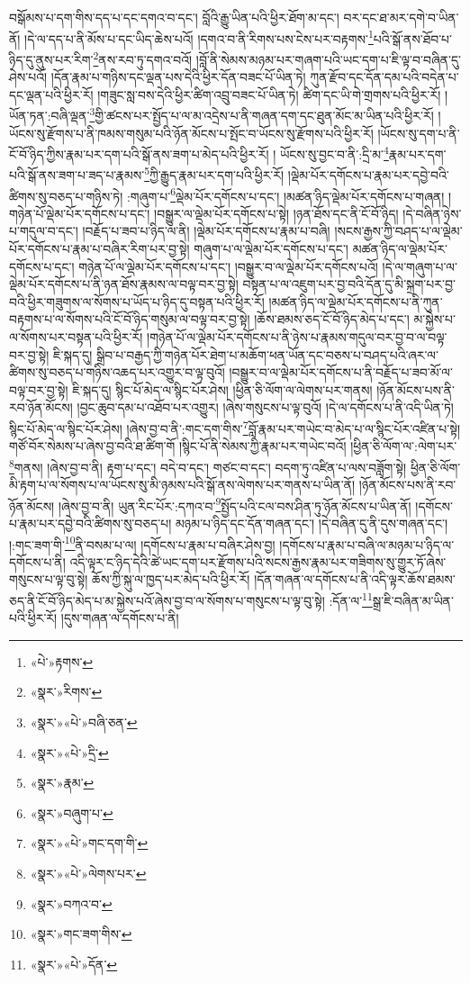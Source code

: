 བསྒོམས་པ་དག་གིས་དད་པ་དང་དགའ་བ་དང་། བློའི་རྒྱུ་ཡིན་པའི་ཕྱིར་ཐོག་མ་དང་། བར་དང་ཐ་མར་དགེ་བ་ཡིན་ནོ། །དེ་ལ་དད་པ་ནི་མོས་པ་དང་ཡིད་ཆེས་པའོ། །དགའ་བ་ནི་རིགས་པས་ངེས་པར་བརྟགས་\footnote{«པེ་»རྟགས་}པའི་སྒོ་ནས་ཐོབ་པ་ཉིད་དུ་ནུས་པར་རིག་\footnote{«སྣར་»རིགས་}ནས་རབ་ཏུ་དགའ་བའོ། །བློ་ནི་སེམས་མཉམ་པར་གཞག་པའི་ཡང་དག་པ་ཇི་ལྟ་བ་བཞིན་དུ་ཤེས་པའོ། །དོན་རྣམ་པ་གཉིས་དང་ལྡན་པས་དེའི་ཕྱིར་དོན་བཟང་པོ་ཡིན་ཏེ། ཀུན་རྫོབ་དང་དོན་དམ་པའི་བདེན་པ་དང་ལྡན་པའི་ཕྱིར་རོ། །གཟུང་སླ་བས་དེའི་ཕྱིར་ཚིག་འབྲུ་བཟང་པོ་ཡིན་ཏེ། ཚིག་དང་ཡི་གེ་གྲགས་པའི་ཕྱིར་རོ། །ཡོན་ཏན་:བཞི་ལྡན་\footnote{«སྣར་»«པེ་»བཞི་ཅན་}གྱི་ཚངས་པར་སྤྱོད་པ་ལ་མ་འདྲེས་པ་ནི་གཞན་དག་དང་ཐུན་མོང་མ་ཡིན་པའི་ཕྱིར་རོ། །ཡོངས་སུ་རྫོགས་པ་ནི་ཁམས་གསུམ་པའི་ཉོན་མོངས་པ་སྤོང་བ་ཡོངས་སུ་རྫོགས་པའི་ཕྱིར་རོ། །ཡོངས་སུ་དག་པ་ནི་ངོ་བོ་ཉིད་ཀྱིས་རྣམ་པར་དག་པའི་སྒོ་ནས་ཟག་པ་མེད་པའི་ཕྱིར་རོ། །
ཡོངས་སུ་བྱང་བ་ནི་:དྲི་མ་\footnote{«སྣར་»«པེ་»དྲི་}རྣམ་པར་དག་པའི་སྒོ་ནས་ཟག་པ་ཟད་པ་རྣམས་\footnote{«སྣར་»རྣམ་}ཀྱི་རྒྱུད་རྣམ་པར་དག་པའི་ཕྱིར་རོ། །ལྡེམ་པོར་དགོངས་པ་རྣམ་པར་དབྱེ་བའི་ཚིགས་སུ་བཅད་པ་གཉིས་ཏེ། :གཞུག་པ་\footnote{«སྣར་»བཞུག་པ་}ལྡེམ་པོར་དགོངས་པ་དང་། །མཚན་ཉིད་ལྡེམ་པོར་དགོངས་པ་གཞན། །གཉེན་པོ་ལྡེམ་པོར་དགོངས་པ་དང་། །བསྒྱུར་ལ་ལྡེམ་པོར་དགོངས་པ་སྟེ། །ཉན་ཐོས་དང་ནི་ངོ་བོ་ཉིད། །དེ་བཞིན་ཉེས་པ་གདུལ་བ་དང་། །བརྗོད་པ་ཟབ་པ་ཉིད་ལ་ནི། །ལྡེམ་པོར་དགོངས་པ་རྣམ་པ་བཞི། །སངས་རྒྱས་ཀྱི་བཤད་པ་ལ་ལྡེམ་པོར་དགོངས་པ་རྣམ་པ་བཞིར་རིག་པར་བྱ་སྟེ། གཞུག་པ་ལ་ལྡེམ་པོར་དགོངས་པ་དང་། མཚན་ཉིད་ལ་ལྡེམ་པོར་དགོངས་པ་དང་། གཉེན་པོ་ལ་ལྡེམ་པོར་དགོངས་པ་དང་། །བསྒྱུར་བ་ལ་ལྡེམ་པོར་དགོངས་པའོ། །དེ་ལ་གཞུག་པ་ལ་ལྡེམ་པོར་དགོངས་པ་ནི་ཉན་ཐོས་རྣམས་ལ་བལྟ་བར་བྱ་སྟེ། བསྟན་པ་ལ་འཇུག་པར་བྱ་བའི་དོན་དུ་མི་སྐྲག་པར་བྱ་བའི་ཕྱིར་གཟུགས་ལ་སོགས་པ་ཡོད་པ་ཉིད་དུ་བསྟན་པའི་ཕྱིར་རོ། །མཚན་ཉིད་ལ་ལྡེམ་པོར་དགོངས་པ་ནི་ཀུན་བརྟགས་པ་ལ་སོགས་པའི་ངོ་བོ་ཉིད་གསུམ་ལ་བལྟ་བར་བྱ་སྟེ། །ཆོས་ཐམས་ཅད་ངོ་བོ་ཉིད་མེད་པ་དང་། མ་སྐྱེས་པ་ལ་སོགས་པར་བསྟན་པའི་ཕྱིར་རོ། །གཉེན་པོ་ལ་ལྡེམ་པོར་དགོངས་པ་ནི་ཉེས་པ་རྣམས་གདུལ་བར་བྱ་བ་ལ་བལྟ་བར་བྱ་སྟེ། ཇི་སྐད་དུ། སྒྲིབ་པ་བརྒྱད་ཀྱི་གཉེན་པོར་ཐེག་པ་མཆོག་ཕན་ཡོན་དང་བཅས་པ་བཤད་པའི་ཞར་ལ་ཚིགས་སུ་བཅད་པ་གཉིས་འཆད་པར་འགྱུར་བ་ལྟ་བུའོ། །བསྒྱུར་བ་ལ་ལྡེམ་པོར་དགོངས་པ་ནི་བརྗོད་པ་ཟབ་མོ་ལ་བལྟ་བར་བྱ་སྟེ། ཇི་སྐད་དུ། སྙིང་པོ་མེད་ལ་སྙིང་པོར་ཤེས། །ཕྱིན་ཅི་ལོག་ལ་ལེགས་པར་གནས། །ཉོན་མོངས་པས་ནི་རབ་ཉོན་མོངས། །བྱང་ཆུབ་དམ་པ་འཐོབ་པར་འགྱུར། །ཞེས་གསུངས་པ་ལྟ་བུའོ། །དེ་ལ་དགོངས་པ་ནི་འདི་ཡིན་ཏེ། སྙིང་པོ་མེད་ལ་སྙིང་པོར་ཤེས། །ཞེས་བྱ་བ་ནི་:གང་དག་གིས་\footnote{«སྣར་»«པེ་»གང་དག་གི་}བློ་རྣམ་པར་གཡེང་བ་མེད་པ་ལ་སྙིང་པོར་འཛིན་པ་སྟེ། གཙོ་བོར་སེམས་པ་ཞེས་བྱ་བའི་ཐ་ཚིག་གོ །སྙིང་པོ་ནི་སེམས་ཀྱི་རྣམ་པར་གཡེང་བའོ། །ཕྱིན་ཅི་ལོག་ལ་:ལེག་པར་\footnote{«སྣར་»«པེ་»ལེགས་པར་}གནས། །ཞེས་བྱ་བ་ནི། རྟག་པ་དང་། བདེ་བ་དང་། གཙང་བ་དང་། བདག་ཏུ་འཛིན་པ་ལས་བཟློག་སྟེ། ཕྱིན་ཅི་ལོག་མི་རྟག་པ་ལ་སོགས་པ་ལ་ཡོངས་སུ་མི་ཉམས་པའི་སྒོ་ནས་ལེགས་པར་གནས་པ་ཡིན་ནོ། །ཉོན་མོངས་པས་ནི་རབ་ཉོན་མོངས། །ཞེས་བྱ་བ་ནི། ཡུན་རིང་པོར་:དཀའ་བ་\footnote{«སྣར་»བཀའ་བ་}སྤྱོད་པའི་ངལ་བས་ཤིན་ཏུ་ཉོན་མོངས་པ་ཡིན་ནོ། །དགོངས་པ་རྣམ་པར་དབྱེ་བའི་ཚིགས་སུ་བཅད་པ། མཉམ་པ་ཉིད་དང་དོན་གཞན་དང་། །དེ་བཞིན་དུ་ནི་དུས་གཞན་དང་། །:གང་ཟག་གི་\footnote{«སྣར་»གང་ཟག་གིས་}ནི་བསམ་པ་ལ། །དགོངས་པ་རྣམ་པ་བཞིར་ཤེས་བྱ། །དགོངས་པ་རྣམ་པ་བཞི་ལ་མཉམ་པ་ཉིད་ལ་དགོངས་པ་ནི། འདི་ལྟར་ང་ཉིད་དེའི་ཚེ་ཡང་དག་པར་རྫོགས་པའི་སངས་རྒྱས་རྣམ་པར་གཟིགས་སུ་གྱུར་ཏོ་ཞེས་གསུངས་པ་ལྟ་བུ་སྟེ། ཆོས་ཀྱི་སྐུ་ལ་ཁྱད་པར་མེད་པའི་ཕྱིར་རོ། །དོན་གཞན་ལ་དགོངས་པ་ནི་འདི་ལྟར་ཆོས་ཐམས་ཅད་ནི་ངོ་བོ་ཉིད་མེད་པ་མ་སྐྱེས་པའོ་ཞེས་བྱ་བ་ལ་སོགས་པ་གསུངས་པ་ལྟ་བུ་སྟེ། :དོན་ལ་\footnote{«སྣར་»«པེ་»དོན་}སྒྲ་ཇི་བཞིན་མ་ཡིན་པའི་ཕྱིར་རོ། །དུས་གཞན་ལ་དགོངས་པ་ནི། 